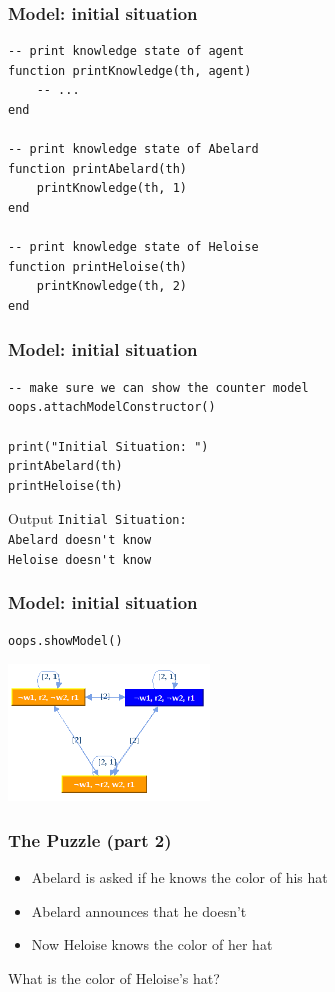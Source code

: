 \documentclass{beamer}
\begin{document}
\begin{frame}[fragile]
\frametitle{Model: initial situation}
\begin{lstlisting}
-- print knowledge state of agent
function printKnowledge(th, agent)
    -- ... 
end

-- print knowledge state of Abelard
function printAbelard(th)
    printKnowledge(th, 1)
end

-- print knowledge state of Heloise
function printHeloise(th)
    printKnowledge(th, 2)
end
\end{lstlisting}
\end{frame}

\begin{frame}[fragile]
\frametitle{Model: initial situation}
\begin{lstlisting}
-- make sure we can show the counter model
oops.attachModelConstructor()

print("Initial Situation: ")
printAbelard(th)
printHeloise(th)
\end{lstlisting}
\begin{block}{Output}
\verb!Initial Situation:! \\
\verb!Abelard doesn't know! \\
\verb!Heloise doesn't know!
\end{block}
\end{frame}

\begin{frame}[fragile]
\frametitle{Model: initial situation}
\begin{lstlisting}
oops.showModel()
\end{lstlisting}
\includegraphics[width=0.4\textwidth]{demo04}
\end{frame}

\begin{frame}
\frametitle{The Puzzle (part 2)}
\begin{itemize}
\item Abelard is asked if he knows the color of his hat
\item Abelard announces that he doesn't
\item Now Heloise knows the color of her hat
\end{itemize}
What is the color of Heloise's hat?
\end{frame}
\end{document}
